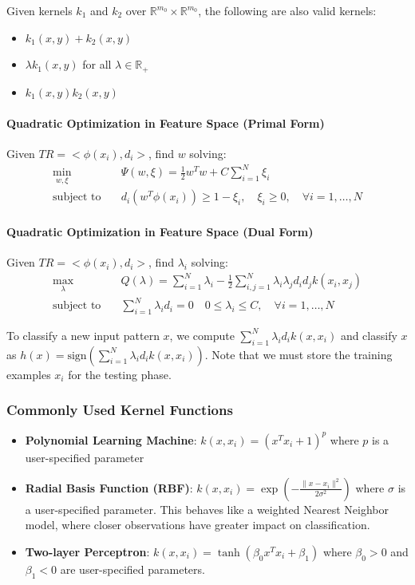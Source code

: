 Given kernels $k_1$ and $k_2$ over $\mathbb{R}^{m_0} \times \mathbb{R}^{m_0}$, the following are also valid kernels:
\begin{itemize}
    \item $k_1(x,y) + k_2(x,y)$
    \item $\lambda k_1(x,y)$ for all $\lambda \in \mathbb{R}_+$
    \item $k_1(x,y)k_2(x,y)$
\end{itemize}

\paragraph{Quadratic Optimization in Feature Space (Primal Form)}
Given $TR = < \phi(x_i),d_i >$, find $w$ solving:
\begin{align*} \min_{w, \xi} \quad & \Psi(w, \xi) = \frac{1}{2}w^T w + C \sum_{i=1}^N \xi_i \\
\text{subject to} \quad & d_i (w^T \phi(x_i)) \geq 1 - \xi_i,\quad \xi_i \geq 0, \quad \forall i = 1, \dots, N \end{align*}

\paragraph{Quadratic Optimization in Feature Space (Dual Form)} Given $TR = < \phi(x_i),d_i >$, find $\lambda_i$ solving:
\begin{align*} \max_{\lambda} \quad & Q(\lambda) = \sum_{i=1}^N \lambda_i - \frac{1}{2} \sum_{i,j=1}^N \lambda_i \lambda_j d_i d_j k(x_i,x_j) \\ \text{subject to} \quad& \sum_{i=1}^N \lambda_i d_i = 0 \quad 0 \leq \lambda_i \leq C, \quad \forall i = 1, \dots, N \end{align*}

To classify a new input pattern $x$, we compute $\sum_{i=1}^N \lambda_i d_i k(x, x_i)$ and classify $x$ as $h(x) = \text{sign}\left(\sum_{i=1}^N \lambda_i d_i k(x, x_i)\right)$. Note that we must store the training examples $x_i$ for the testing phase.

\subsubsection{Commonly Used Kernel Functions}
\begin{itemize}
    \item \textbf{Polynomial Learning Machine}: $k(x, x_i) = (x^T x_i + 1)^p$ where $p$ is a user-specified parameter
    \item \textbf{Radial Basis Function (RBF)}: $k(x, x_i) = \exp\left(-\frac{\|x - x_i\|^2}{2\sigma^2}\right)$ where $\sigma$ is a user-specified parameter. This behaves like a weighted Nearest Neighbor model, where closer observations have greater impact on classification.
    \item \textbf{Two-layer Perceptron}: $k(x, x_i) = \tanh(\beta_0 x^T x_i + \beta_1)$ where $\beta_0 > 0$ and $\beta_1 < 0$ are user-specified parameters.
\end{itemize}

